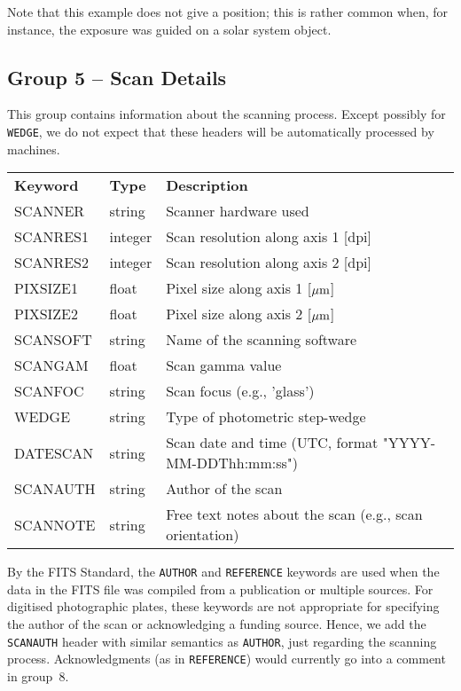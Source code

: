 \documentclass[11pt]{ivoa}
\newcommand\cardname[1]{\texttt{\color{keyword}#1}}
\begin{document}
Note that this example does not give a position; this is rather common
when, for instance, the exposure was guided on a solar system object.


\subsection{Group 5 – Scan Details}

This group contains information about the scanning process.  Except
possibly for \cardname{WEDGE}, we do not expect that these headers will
be automatically processed by machines.

\begin{inlinetable}
\footnotesize
\begin{tabular}{llp{}}
\sptablerule
\textbf{Keyword}&\textbf{Type}&\textbf{Description}\\
\sptablerule
SCANNER  &string  &Scanner hardware used\\
SCANRES1 &integer &Scan resolution along axis 1 [dpi]\\
SCANRES2 &integer &Scan resolution along axis 2 [dpi]\\
PIXSIZE1 &float   &Pixel size along axis 1 [$\mu\rm m$]\\
PIXSIZE2 &float   &Pixel size along axis 2 [$\mu\rm m$]\\
SCANSOFT &string  &Name of the scanning software\\
SCANGAM  &float   &Scan gamma value\\
SCANFOC  &string  &Scan focus (e.g., 'glass')\\
WEDGE    &string  &Type of photometric step-wedge\\
DATESCAN &string  &
  Scan date and time (UTC, format "YYYY-MM-DDThh:mm:ss")\\
SCANAUTH &string  &Author of the scan\\
SCANNOTE &string  &
  Free text notes about the scan (e.g., scan orientation)\\
\end{tabular}
\end{inlinetable}


By the FITS Standard, the \cardname{AUTHOR} and \cardname{REFERENCE} 
keywords are used when the
data in the FITS file was compiled from a publication or multiple
sources. For digitised photographic plates, these keywords are not
appropriate for specifying the author of the scan or acknowledging a
funding source. Hence, we add the \cardname{SCANAUTH} header with
similar semantics as \cardname{AUTHOR}, just regarding the scanning
process.  Acknowledgments (as in \cardname{REFERENCE}) would currently
go into a comment in group~8.
\end{document}
